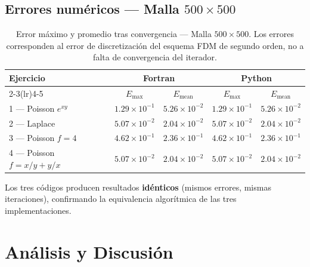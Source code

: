 \documentclass[12pt, a4paper]{article}
\begin{document}
\subsection{Errores numéricos — Malla $500\times500$}

\begin{table}[H]
  \centering
  \caption{Error máximo y promedio tras convergencia — Malla $500\times500$.
           Los errores corresponden al error de discretización del esquema FDM
           de segundo orden, no a falta de convergencia del iterador.}
  \label{tab:errores}
  \begin{tabular}{lcccc}
    \toprule
    \multirow{2}{*}{\textbf{Ejercicio}} &
    \multicolumn{2}{c}{\textbf{Fortran}} &
    \multicolumn{2}{c}{\textbf{Python}} \\
    \cmidrule(lr){2-3}\cmidrule(lr){4-5}
    & $E_\text{max}$ & $E_\text{mean}$ & $E_\text{max}$ & $E_\text{mean}$ \\
    \midrule
    1 — Poisson $e^{xy}$     & $1.29\times10^{-1}$ & $5.26\times10^{-2}$
                             & $1.29\times10^{-1}$ & $5.26\times10^{-2}$ \\
    2 — Laplace              & $5.07\times10^{-2}$ & $2.04\times10^{-2}$
                             & $5.07\times10^{-2}$ & $2.04\times10^{-2}$ \\
    3 — Poisson $f=4$        & $4.62\times10^{-1}$ & $2.36\times10^{-1}$
                             & $4.62\times10^{-1}$ & $2.36\times10^{-1}$ \\
    4 — Poisson $f=x/y+y/x$ & $5.07\times10^{-2}$ & $2.04\times10^{-2}$
                             & $5.07\times10^{-2}$ & $2.04\times10^{-2}$ \\
    \bottomrule
  \end{tabular}
\end{table}

Los tres códigos producen resultados \textbf{idénticos} (mismos errores,
mismas iteraciones), confirmando la equivalencia algorítmica de las tres
implementaciones.

\section{Análisis y Discusión}
\end{document}

